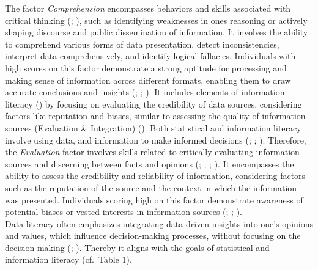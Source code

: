 \documentclass[
  12pt,
  a4paper,
  twoside]{article}
\begin{document}
The factor \emph{Comprehension} encompasses behaviors and skills associated with critical thinking (; ), such as identifying weaknesses in ones reasoning or actively shaping discourse and public dissemination of information. It involves the ability to comprehend various forms of data presentation, detect inconsistencies, interpret data comprehensively, and identify logical fallacies. Individuals with high scores on this factor demonstrate a strong aptitude for processing and making sense of information across different formats, enabling them to draw accurate conclusions and insights (; ; ).
It includes elements of information literacy () by focusing on evaluating the credibility of data sources, considering factors like reputation and biases, similar to assessing the quality of information sources (Evaluation \& Integration) (). Both statistical and information literacy involve using data, and information to make informed decisions (; ; ).
Therefore, the \emph{Evaluation} factor involves skills related to critically evaluating information sources and discerning between facts and opinions (; ; ; ). It encompasses the ability to assess the credibility and reliability of information, considering factors such as the reputation of the source and the context in which the information was presented. Individuals scoring high on this factor demonstrate awareness of potential biases or vested interests in information sources (; ; ).\\
Data literacy often emphasizes integrating data-driven insights into one's opinions and values, which influence decision-making processes, without focusing on the decision making (; ). Thereby it aligns with the goals of statistical and information literacy (cf.~Table 1).
\end{document}
